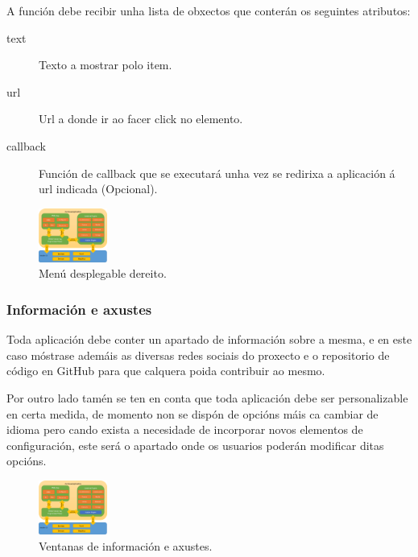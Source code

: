       A función debe recibir unha lista de obxectos que conterán os 
seguintes atributos:

      \begin{description}
       \item [text] Texto a mostrar polo item.
       \item [url] Url a donde ir ao facer click no elemento.
       \item [callback] Función de callback que se executará unha vez se 
redirixa a aplicación á url indicada (Opcional).
      \end{description}

      \begin{figure}[h!]
        \begin{center}
        \includegraphics[width=0.2\textwidth]{./img/cordova_arquitectura.png}
        \caption{Menú desplegable dereito.}
        \end{center}
      \end{figure}


      \subsubsection{Información e axustes}
      Toda aplicación debe conter un apartado de información sobre a mesma, e 
en este caso móstrase ademáis as diversas redes sociais do proxecto e o 
repositorio de código en GitHub para que calquera poida contribuir ao mesmo.

      Por outro lado tamén se ten en conta que toda aplicación debe ser 
personalizable en certa medida, de momento non se dispón de opcións máis ca 
cambiar de idioma pero cando exista a necesidade de incorporar 
novos elementos de configuración, este será o apartado onde os usuarios poderán 
modificar ditas opcións.

      \begin{figure}[h!]
        \begin{center}
        \includegraphics[width=0.2\textwidth]{./img/cordova_arquitectura.png}
        \caption{Ventanas de información e axustes.}
        \end{center}
      \end{figure}

